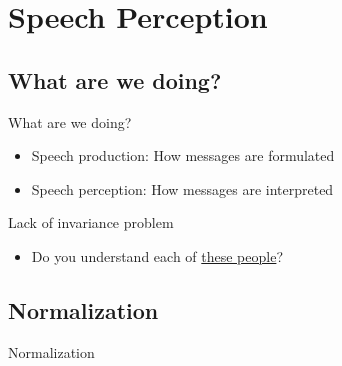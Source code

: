 \documentclass{beamer}
\subtitle[Speech Perception]{Speech Perception}
\newcommand{\suboneone}{What are we doing?}
\newcommand{\subonetwo}{Normalization}
\begin{document}
  

  \section{Speech Perception}
    \subsection{\suboneone}
      \begin{frame}{\suboneone}
        \begin{block}{}
          \begin{itemize}
            \item Speech production: How messages are formulated
            \item Speech perception: How messages are interpreted
          \end{itemize}
        \end{block}
        \begin{alertblock}{Lack of invariance problem}
          
          \begin{itemize}
            \item Do you understand each of \href{https://youtu.be/Q7ijTGd6hy0?t=5}{these people}?
          \end{itemize}
        \end{alertblock}
      \end{frame}

    \subsection{\subonetwo}
      \begin{frame}[t]{\subonetwo}
        \begin{definition}
          
        \end{definition}
      \end{frame}
\end{document}
